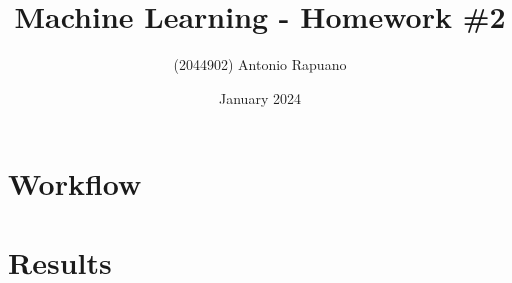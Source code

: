 \documentclass{article}
\title{Machine Learning - Homework \#2}
\author{(2044902) Antonio Rapuano}
\date{January 2024}
\begin{document}
\maketitle
\thispagestyle{empty}
\tableofcontents

\newpage
\setcounter{page}{1}



\section{Workflow}





\section{Results}






\appendix

\end{document}
